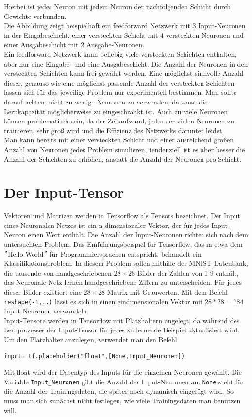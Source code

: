 Hierbei ist jedes Neuron mit jedem Neuron der nachfolgenden Schicht durch Gewichte verbunden.\\
Die Abbildung zeigt beispielhaft ein feedforward Netzwerk mit 3 Input-Neuronen in der Eingabeschicht, einer versteckten Schicht mit 4 versteckten Neuronen und einer Ausgabeschicht mit 2 Ausgabe-Neuronen.\cite{Bishop1995}\\
Ein feedforward Netzwerk kann beliebig viele versteckten Schichten enthalten, aber nur eine Eingabe- und eine Ausgabeschicht. Die Anzahl der Neuronen in den versteckten Schichten kann frei gew\"ahlt werden. Eine möglichst sinnvolle Anzahl dieser, genauso wie eine möglichst passende Anzahl der versteckten Schichten lassen sich für das jeweilige Problem nur experimentell bestimmen.\cite{handson} Man sollte darauf achten, nicht zu wenige Neuronen zu verwenden, da sonst die Lernkapazit\"at m\"oglicherweise zu eingeschr\"ankt ist. Auch zu viele Neuronen k\"onnen problematisch sein, da der Zeitaufwand, jedes der vielen Neuronen zu trainieren, sehr groß wird und die Effizienz des Netzwerks darunter leidet.\cite{Rashid} \\ Man kann bereits mit einer versteckten Schicht und einer ausreichend gro\ss en Anzahl von Neuronen jedes Problem simulieren, tendenziell ist es aber besser die Anzahl der Schichten zu erh\"ohen, anstatt die Anzahl der Neuronen pro Schicht.\cite{handson} 
\section{Der Input-Tensor}
Vektoren und Matrizen werden in Tensorflow als Tensors bezeichnet. Der Input eines Neuronalen Netzes ist ein n-dimensionaler Vektor, der f\"ur jedes Input-Neuron einen Wert enth\"alt. Die Anzahl der Input-Neuronen richtet sich nach dem untersuchten Problem. Das Einf\"uhrungsbeispiel f\"ur Tensorflow, das in etwa dem $"$Hello World$"$ f\"ur Programmiersprachen entspricht, behandelt ein Klassifikationsproblem.\cite{handson} In diesem Problem sollen mithilfe der MNIST Datenbank, die tausende von handgeschriebenen $28 \times 28$ Bilder der Zahlen von 1-9 enth\"alt, das Neuronale Netz lernen handgeschriebene Ziffern zu unterscheiden. F\"ur jedes dieser Bilder existiert eine $28 \times 28$ Matrix mit Grauwerten. Mit dem Befehl \lstinline$reshape(-1,..)$ \cite{handson} l\"asst es sich in einen eindimensionalen Vektor mit  $28*28=784$ Input-Neuronen verwandeln.\\
Input-Tensore werden in Tensorflow mit Platzhaltern angelegt, da w\"ahrend des Lernprozesses der Input-Tensor f\"ur jedes zu lernende Beispiel aktualisiert wird. Um den Platzhalter anzulegen, verwendet man den Befehl\cite{cookbook}
\begin{lstlisting}
input= tf.placeholder("float",[None,Input_Neuronen])
\end{lstlisting}
Mit float wird der Datentyp des Inputs f\"ur die einzelnen Neuronen gew\"ahlt. Die Variable \lstinline$Input_Neuronen$ gibt die Anzahl der Input-Neuronen an. \lstinline$None$ steht f\"ur die Anzahl der Trainingsdaten, die sp\"ater noch dynamisch eingef\"ugt wird. So muss man sich zun\"achst nicht festlegen, wie viele Trainingsdaten man benutzen will.\cite{handson} 

